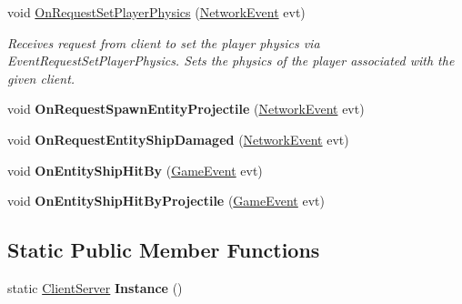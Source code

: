 \begin{DoxyCompactItemize}
void \hyperlink{class_skyrates_1_1_server_1_1_network_1_1_client_server_ab12fc7b88d98e13c6ea6bd00badde39f}{On\-Request\-Set\-Player\-Physics} (\hyperlink{class_skyrates_1_1_common_1_1_network_1_1_event_1_1_network_event}{Network\-Event} evt)
\begin{DoxyCompactList}\small\item\em Receives request from client to set the player physics via Event\-Request\-Set\-Player\-Physics. Sets the physics of the player associated with the given client. \end{DoxyCompactList}\item 
\hypertarget{class_skyrates_1_1_server_1_1_network_1_1_client_server_a7c651e02a480935105cfb169f68395b4}{void {\bfseries On\-Request\-Spawn\-Entity\-Projectile} (\hyperlink{class_skyrates_1_1_common_1_1_network_1_1_event_1_1_network_event}{Network\-Event} evt)}\label{class_skyrates_1_1_server_1_1_network_1_1_client_server_a7c651e02a480935105cfb169f68395b4}

\item 
\hypertarget{class_skyrates_1_1_server_1_1_network_1_1_client_server_a6391f98a3985073546d38b4523eca432}{void {\bfseries On\-Request\-Entity\-Ship\-Damaged} (\hyperlink{class_skyrates_1_1_common_1_1_network_1_1_event_1_1_network_event}{Network\-Event} evt)}\label{class_skyrates_1_1_server_1_1_network_1_1_client_server_a6391f98a3985073546d38b4523eca432}

\item 
\hypertarget{class_skyrates_1_1_server_1_1_network_1_1_client_server_a7e9f838c7e76be903bb2a591c5d3d2f0}{void {\bfseries On\-Entity\-Ship\-Hit\-By} (\hyperlink{class_skyrates_1_1_client_1_1_game_1_1_event_1_1_game_event}{Game\-Event} evt)}\label{class_skyrates_1_1_server_1_1_network_1_1_client_server_a7e9f838c7e76be903bb2a591c5d3d2f0}

\item 
\hypertarget{class_skyrates_1_1_server_1_1_network_1_1_client_server_a0e87759acd9e27ba50d11645b54ce662}{void {\bfseries On\-Entity\-Ship\-Hit\-By\-Projectile} (\hyperlink{class_skyrates_1_1_client_1_1_game_1_1_event_1_1_game_event}{Game\-Event} evt)}\label{class_skyrates_1_1_server_1_1_network_1_1_client_server_a0e87759acd9e27ba50d11645b54ce662}

\end{DoxyCompactItemize}
\subsection*{Static Public Member Functions}
\begin{DoxyCompactItemize}
\item 
\hypertarget{class_skyrates_1_1_server_1_1_network_1_1_client_server_a2fd0b559183f128fbeabf0dfd9fe172f}{static \hyperlink{class_skyrates_1_1_server_1_1_network_1_1_client_server}{Client\-Server} {\bfseries Instance} ()}\label{class_skyrates_1_1_server_1_1_network_1_1_client_server_a2fd0b559183f128fbeabf0dfd9fe172f}

\end{DoxyCompactItemize}
